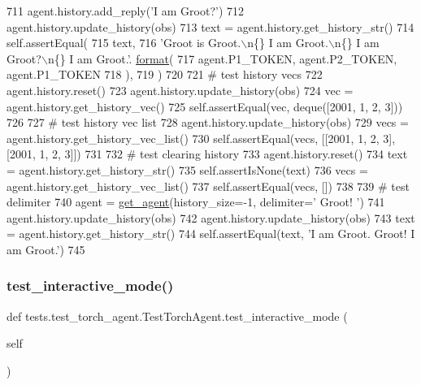 \begin{DoxyCode}
711         agent.history.add\_reply(\textcolor{stringliteral}{'I am Groot?'})
712         agent.history.update\_history(obs)
713         text = agent.history.get\_history\_str()
714         self.assertEqual(
715             text,
716             \textcolor{stringliteral}{'Groot is Groot.\(\backslash\)n\{\} I am Groot.\(\backslash\)n\{\} I am Groot?\(\backslash\)n\{\} I am Groot.'}.
      \hyperlink{namespaceparlai_1_1chat__service_1_1services_1_1messenger_1_1shared__utils_a32e2e2022b824fbaf80c747160b52a76}{format}(
717                 agent.P1\_TOKEN, agent.P2\_TOKEN, agent.P1\_TOKEN
718             ),
719         )
720 
721         \textcolor{comment}{# test history vecs}
722         agent.history.reset()
723         agent.history.update\_history(obs)
724         vec = agent.history.get\_history\_vec()
725         self.assertEqual(vec, deque([2001, 1, 2, 3]))
726 
727         \textcolor{comment}{# test history vec list}
728         agent.history.update\_history(obs)
729         vecs = agent.history.get\_history\_vec\_list()
730         self.assertEqual(vecs, [[2001, 1, 2, 3], [2001, 1, 2, 3]])
731 
732         \textcolor{comment}{# test clearing history}
733         agent.history.reset()
734         text = agent.history.get\_history\_str()
735         self.assertIsNone(text)
736         vecs = agent.history.get\_history\_vec\_list()
737         self.assertEqual(vecs, [])
738 
739         \textcolor{comment}{# test delimiter}
740         agent = \hyperlink{namespacetests_1_1test__torch__agent_ae929d109305aaea29fbfa13ecf1f32e9}{get\_agent}(history\_size=-1, delimiter=\textcolor{stringliteral}{' Groot! '})
741         agent.history.update\_history(obs)
742         agent.history.update\_history(obs)
743         text = agent.history.get\_history\_str()
744         self.assertEqual(text, \textcolor{stringliteral}{'I am Groot. Groot! I am Groot.'})
745 
\end{DoxyCode}
\mbox{\label{classtests_1_1test__torch__agent_1_1TestTorchAgent_aadf263b222e27bfd83d568148683a8e0}} 
\subsubsection{\texorpdfstring{test\+\_\+interactive\+\_\+mode()}{test\_interactive\_mode()}}
{\footnotesize\ttfamily def tests.\+test\+\_\+torch\+\_\+agent.\+Test\+Torch\+Agent.\+test\+\_\+interactive\+\_\+mode (\begin{DoxyParamCaption}\item[{}]{self }\end{DoxyParamCaption})}

